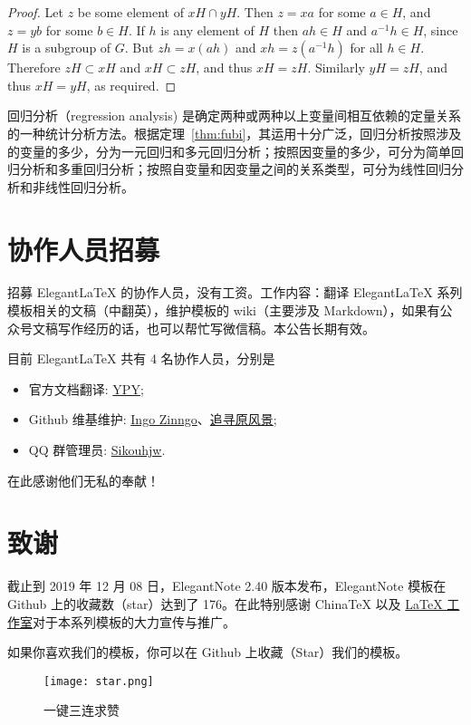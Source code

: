 \documentclass[cn,hazy,blue,screen,14pt]{elegantnote}
\begin{document}
\begin{proof}
Let $z$ be some element of $xH \cap yH$.  Then $z = xa$ for some $a \in H$, and $z = yb$ for some $b \in H$. If $h$ is any element of $H$ then $ah \in H$ and $a^{-1}h \in H$, since $H$ is a subgroup of $G$. But $zh = x(ah)$ and $xh = z(a^{-1}h)$ for all $h \in H$. Therefore $zH \subset xH$ and $xH \subset zH$, and thus $xH = zH$.  Similarly $yH = zH$, and thus $xH = yH$, as required.
\end{proof}


回归分析（regression analysis) 是确定两种或两种以上变量间相互依赖的定量关系的一种统计分析方法。根据定理~\ref{thm:fubi}，其运用十分广泛，回归分析按照涉及的变量的多少，分为一元回归和多元回归分析；按照因变量的多少，可分为简单回归分析和多重回归分析；按照自变量和因变量之间的关系类型，可分为线性回归分析和非线性回归分析。


\section{协作人员招募}

招募 Elegant\LaTeX{} 的协作人员，没有工资。工作内容：翻译 Elegant\LaTeX{} 系列模板相关的文稿（中翻英），维护模板的 wiki（主要涉及 Markdown），如果有公众号文稿写作经历的话，也可以帮忙写微信稿。本公告长期有效。

目前 ElegantLaTeX 共有 4 名协作人员，分别是
\begin{itemize}
  \item 官方文档翻译: \href{https://github.com/peggy2006xzyz}{YPY};
  \item Github 维基维护: \href{https://github.com/izinngo}{Ingo Zinngo}、\href{https://github.com/xiaohao890809}{追寻原风景};
  \item QQ 群管理员: \href{https://github.com/sikouhjw}{Sikouhjw}.
\end{itemize}

在此感谢他们无私的奉献！


\section{致谢}

截止到 2019 年 12 月 08 日，ElegantNote 2.40 版本发布，ElegantNote 模板在 Github 上的收藏数（star）达到了 176。在此特别感谢 China\TeX{} 以及 \href{http://www.latexstudio.net/}{\LaTeX{} 工作室}对于本系列模板的大力宣传与推广。

如果你喜欢我们的模板，你可以在 Github 上收藏（Star）我们的模板。
\begin{figure}[htbp]
  \centering
  \texttt{[image: star.png]}
  \caption{一键三连求赞}
\end{figure}
\end{document}
